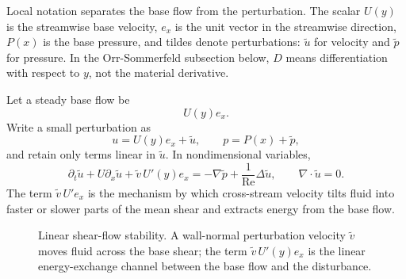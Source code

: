 Local notation separates the base flow from the perturbation.  The scalar
\(U(y)\) is the streamwise base velocity, \(e_x\) is the unit vector in the
streamwise direction, \(P(x)\) is the base pressure, and tildes denote
perturbations: \(\tilde u\) for velocity and \(\tilde p\) for pressure.  In
the Orr-Sommerfeld subsection below, \(D\) means differentiation with respect
to \(y\), not the material derivative.

Let a steady base flow be
\[
  U(y)e_x.
\]
Write a small perturbation as
\[
  u=U(y)e_x+\tilde u,\qquad
  p=P(x)+\tilde p,
\]
and retain only terms linear in \(\tilde u\). In nondimensional variables,
\[
  \boxed{
  \partial_t\tilde u
  +
  U\partial_x\tilde u
  +
  \tilde v\,U'(y)e_x
  =
  -\nabla\tilde p
  +
  \frac1{\mathrm{Re}}\Delta\tilde u,
  \qquad
  \nabla\cdot\tilde u=0.
  }
\]
The term \(\tilde v\,U'e_x\) is the mechanism by which cross-stream velocity
tilts fluid into faster or slower parts of the mean shear and extracts energy
from the base flow.

\begin{figure}[htbp]
\centering
{}
\caption{Linear shear-flow stability. A wall-normal perturbation velocity
\(\tilde v\) moves fluid across the base shear; the term
\(\tilde v\,U'(y)e_x\) is the linear energy-exchange channel between the base
flow and the disturbance.}
\label{fig:shear-stability-mechanism}
\end{figure}

